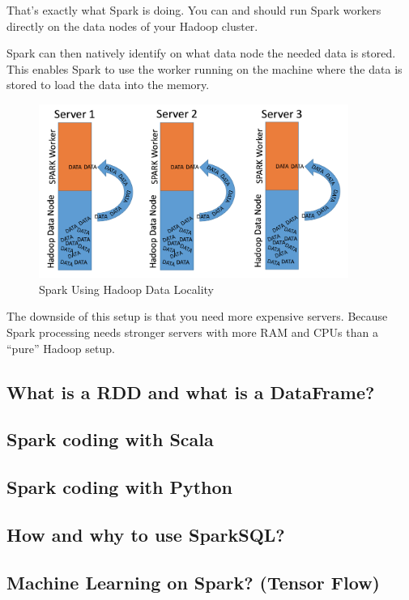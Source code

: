 \documentclass[12pt, numbers=noenddot]{scrreprt} %
\begin{document}
That’s exactly what Spark is doing. You can and should run Spark workers directly on the data nodes of your Hadoop cluster.

Spark can then natively identify on what data node the needed data is stored. This enables Spark to use the worker running on the machine where the data is stored to load the data into the memory.

\begin{figure}[htbp]
  \centering
     \includegraphics[width=0.9\textwidth]{images/Spark-Data-Locality}
  \caption{Spark Using Hadoop Data Locality}
  \label{fig:Bild1}
\end{figure}

The downside of this setup is that you need more expensive servers. Because Spark processing needs stronger servers with more RAM and CPUs than a “pure” Hadoop setup.


\subsection{What is a RDD and what is a DataFrame?}
\subsection{Spark coding with Scala}
\subsection{Spark coding with Python}
\subsection{How and why to use SparkSQL?}
\subsection{Machine Learning on Spark? (Tensor Flow)}
\end{document}
